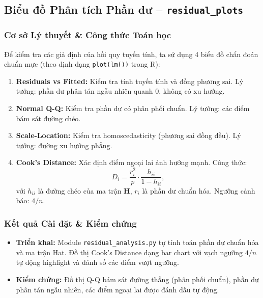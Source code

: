 \subsection{Biểu đồ Phân tích Phần dư -- \texttt{residual\_plots}}

\subsubsection{Cơ sở Lý thuyết \& Công thức Toán học}

Để kiểm tra các giả định của hồi quy tuyến tính, ta sử dụng 4 biểu đồ chẩn đoán chuẩn
mực (theo định dạng \texttt{plot(lm())} trong R):

\begin{enumerate}
    \item \textbf{Residuals vs Fitted:} Kiểm tra tính tuyến tính và đồng phương sai.
        Lý tưởng: phần dư phân tán ngẫu nhiên quanh 0, không có xu hướng.
    \item \textbf{Normal Q-Q:} Kiểm tra phần dư có phân phối chuẩn.
        Lý tưởng: các điểm bám sát đường chéo.
    \item \textbf{Scale-Location:} Kiểm tra homoscedasticity (phương sai đồng đều).
        Lý tưởng: đường xu hướng phẳng.
    \item \textbf{Cook's Distance:} Xác định điểm ngoại lai ảnh hưởng mạnh.
        Công thức:
        \begin{equation}
            D_i = \frac{r_i^2}{p} \cdot \frac{h_{ii}}{1 - h_{ii}},
        \end{equation}
        với $h_{ii}$ là đường chéo của ma trận $\mathbf{H}$,
        $r_i$ là phần dư chuẩn hóa.
        Ngưỡng cảnh báo: $4/n$.
\end{enumerate}

\subsubsection{Kết quả Cài đặt \& Kiểm chứng}

\begin{itemize}
    \item \textbf{Triển khai:} Module \texttt{residual\_analysis.py} tự tính toán phần dư
        chuẩn hóa và ma trận Hat. Đồ thị Cook's Distance dạng bar chart với vạch ngưỡng
        $4/n$ tự động highlight và đánh số các điểm vượt ngưỡng.
    \item \textbf{Kiểm chứng:} Đồ thị Q-Q bám sát đường thẳng (phân phối chuẩn),
        phần dư phân tán ngẫu nhiên, các điểm ngoại lai được đánh dấu tự động.
\end{itemize}

